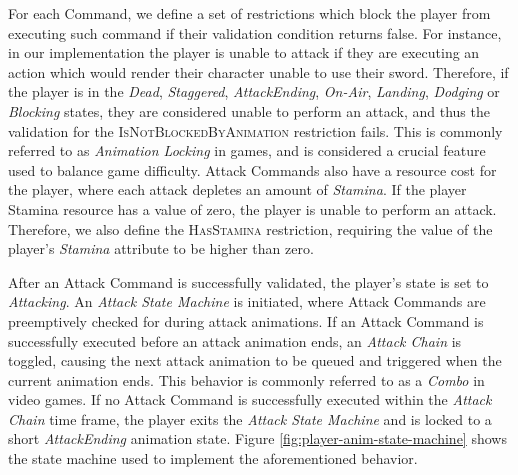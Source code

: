 For each Command, we define a set of restrictions which block the player from executing such command if their validation condition returns false. For instance, in our implementation the player is unable to attack if they are executing an action which would render their character unable to use their sword. Therefore, if the player is in the \emph{Dead}, \emph{Staggered}, \emph{AttackEnding}, \emph{On-Air}, \emph{Landing}, \emph{Dodging} or \emph{Blocking} states, they are considered unable to perform an attack, and thus the validation for the \textsc{IsNotBlockedByAnimation} restriction fails. This is commonly referred to as \emph{Animation Locking} in games, and is considered a crucial feature used to balance game difficulty. Attack Commands also have a resource cost for the player, where each attack depletes an amount of \emph{Stamina}. If the player Stamina resource has a value of zero, the player is unable to perform an attack. Therefore, we also define the \textsc{HasStamina} restriction, requiring the value of the player's \emph{Stamina} attribute to be higher than zero.

After an Attack Command is successfully validated, the player's state is set to \emph{Attacking}. An \emph{Attack State Machine} is initiated, where Attack Commands are preemptively checked for during attack animations. If an Attack Command is successfully executed before an attack animation ends, an \emph{Attack Chain} is toggled, causing the next attack animation to be queued and triggered when the current animation ends. This behavior is commonly referred to as a \emph{Combo} in video games. If no Attack Command is successfully executed within the \emph{Attack Chain} time frame, the player exits the \emph{Attack State Machine} and is locked to a short \emph{AttackEnding} animation state. Figure \ref{fig:player-anim-state-machine} shows the state machine used to implement the aforementioned behavior.




